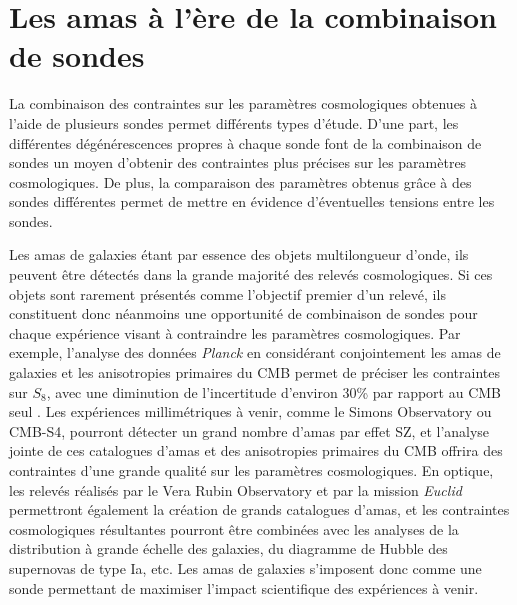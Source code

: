 \section*{Les amas à l'ère de la combinaison de sondes}

La combinaison des contraintes sur les paramètres cosmologiques obtenues à l'aide de plusieurs sondes permet différents types d'étude.
D'une part, les différentes dégénérescences propres à chaque sonde font de la combinaison de sondes un moyen d'obtenir des contraintes plus précises sur les paramètres cosmologiques.
De plus, la comparaison des paramètres obtenus grâce à des sondes différentes permet de mettre en évidence d'éventuelles tensions entre les sondes.

Les amas de galaxies étant par essence des objets multilongueur d'onde, ils peuvent être détectés dans la grande majorité des relevés cosmologiques.
Si ces objets sont rarement présentés comme l'objectif premier d'un relevé, ils constituent donc néanmoins une opportunité de combinaison de sondes pour chaque expérience visant à contraindre les paramètres cosmologiques.
Par exemple, l'analyse des données \textit{Planck} en considérant conjointement les amas de galaxies et les anisotropies primaires du CMB permet de préciser les contraintes sur $S_8$, avec une diminution de l'incertitude d'environ 30\% par rapport au CMB seul \cite{salvati_constraints_2018}.
Les expériences millimétriques à venir, comme le Simons Observatory ou CMB-S4, pourront détecter un grand nombre d'amas par effet SZ, et l'analyse jointe de ces catalogues d'amas et des anisotropies primaires du CMB offrira des contraintes d'une grande qualité sur les paramètres cosmologiques.
En optique, les relevés réalisés par le Vera Rubin Observatory et par la mission \textit{Euclid} permettront également la création de grands catalogues d'amas, et les contraintes cosmologiques résultantes pourront être combinées avec les analyses de la distribution à grande échelle des galaxies, du diagramme de Hubble des supernovas de type Ia, etc.
Les amas de galaxies s'imposent donc comme une sonde permettant de maximiser l'impact scientifique des expériences à venir.


